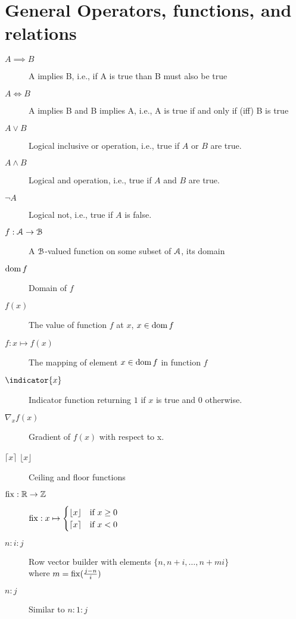 \documentclass[../main.tex]{subfiles}
\begin{document}
\section*{General Operators, functions, and relations}
\begin{description}
  \item[$A\implies B$] A implies B, i.e., if A is true than B must also be true
  \item[$A\iff B$] A implies B and B implies A, i.e., A is true if and only if (iff) B is true
  \item[$A\lor B$] Logical inclusive or operation, i.e., true if $A$ or $B$ are true.
  \item[$A\land B$] Logical and operation, i.e., true if $A$ and $B$ are true.
  \item[$\lnot A$] Logical not, i.e., true if $A$ is false.
  \item[$f:\mathcal{A}\to\mathcal{B}$] A $\mathcal{B}$-valued function on some subset of $\mathcal{A}$, its domain
  \item[$\operatorname{dom} f$] Domain of $f$
  \item[$f(x)$] The value of function $f$ at $x$, $x\in\operatorname{dom} f$
  \item[$f:x\mapsto f(x)$] The mapping of element $x\in\operatorname{dom} f$ in function $f$
  \item[$\indicator{x}$] Indicator function returning $1$ if $x$ is true and $0$ otherwise.
  \item[$\nabla_{x}f(x)$] Gradient of $f(x)$ with respect to x.
  \item[$\lceil x\rceil$ $\lfloor x\rfloor$] Ceiling and floor functions
  \item[$\operatorname{fix}:\mathbb{R}\to\mathbb{Z}$] $\operatorname{fix}:x\mapsto
        \begin{cases}
          \lfloor x\rfloor&\text{if $x\geq0$}\\
          \lceil x\rceil&\text{if $x<0$}\\
        \end{cases}
        $
  \item[$n:i:j$] Row vector builder with elements ${\{n,n+i,\dots,n+mi\}}$
        \\where $m=\operatorname{fix}(\frac{j-n}{i})$
  \item[$n\mathbin{:}j$] Similar to ${n\mathbin{:}1\mathbin{:}j}$
\end{description}
\end{document}
